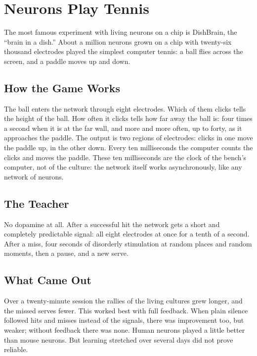 \chapter{Neurons Play Tennis}

The most famous experiment with living neurons on a chip is DishBrain, the ``brain in a dish.'' About a million neurons grown on a chip with twenty-six thousand electrodes played the simplest computer tennis: a ball flies across the screen, and a paddle moves up and down.

\section*{How the Game Works}

The ball enters the network through eight electrodes. Which of them clicks tells the height of the ball. How often it clicks tells how far away the ball is: four times a second when it is at the far wall, and more and more often, up to forty, as it approaches the paddle. The output is two regions of electrodes: clicks in one move the paddle up, in the other down. Every ten milliseconds the computer counts the clicks and moves the paddle. These ten milliseconds are the clock of the bench's computer, not of the culture: the network itself works asynchronously, like any network of neurons.


\section*{The Teacher}

No dopamine at all. After a successful hit the network gets a short and completely predictable signal: all eight electrodes at once for a tenth of a second. After a miss, four seconds of disorderly stimulation at random places and random moments, then a pause, and a new serve.

\section*{What Came Out}

Over a twenty-minute session the rallies of the living cultures grew longer, and the missed serves fewer. This worked best with full feedback. When plain silence followed hits and misses instead of the signals, there was improvement too, but weaker; without feedback there was none. Human neurons played a little better than mouse neurons. But learning stretched over several days did not prove reliable.

